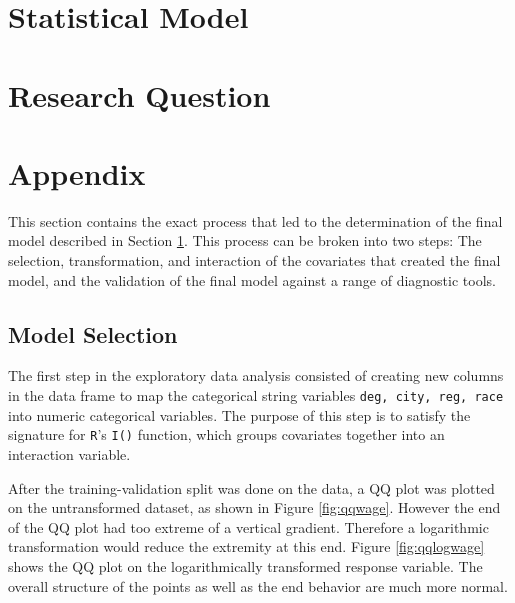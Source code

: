 \documentclass{article}
\begin{document}
  \section{Statistical Model} \label{final_model}

  \section{Research Question}

  \section{Appendix}
    This section contains the exact process that led to the determination of the final
    model described in Section \ref{final_model}. This process can be broken into two steps:
    The selection, transformation, and interaction of the covariates that created the
    final model, and the validation of the final model against a range of diagnostic tools.

    \subsection{Model Selection}
      The first step in the exploratory data analysis consisted of creating new columns in the
      data frame to map the categorical string variables \texttt{deg, city, reg, race} into
      numeric categorical variables. The purpose of this step is to satisfy the signature for \texttt{R}'s \texttt{I()}
      function, which groups covariates together into an interaction variable.

      After the training-validation split was done on the data, a QQ plot was plotted on
      the untransformed dataset, as shown in Figure \ref{fig:qqwage}. However the end
      of the QQ plot had too extreme of a vertical gradient. Therefore a logarithmic
      transformation would reduce the extremity at this end. Figure \ref{fig:qqlogwage}
      shows the QQ plot on the logarithmically transformed response variable. The
      overall structure of the points as well as the end behavior are much more
      normal.
\end{document}
